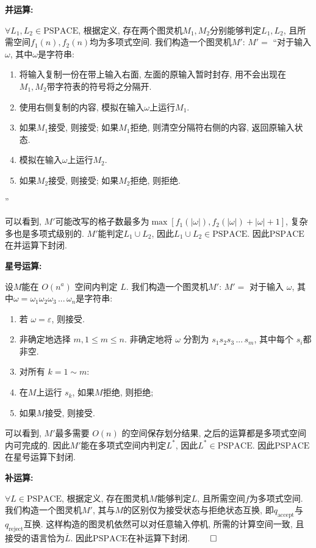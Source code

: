 \documentclass[UTF8]{report}
\renewenvironment{proof}{{\setlength{\parskip}{7pt}\noindent\hskip 2em \bf 证明 \quad}}{\hfill$\qed$\par}
\newcommand{\PSPACE}{\mathrm{PSPACE}}
\begin{document}
\begin{proof}
    \textbf{并运算:}

    $\forall L_1,L_2 \in \PSPACE$, 根据定义, 存在两个图灵机$M_1,M_2$分别能够判定$L_1,L_2$, 且所需空间$f_1(n), f_2(n)$均为多项式空间. 我们构造一个图灵机$M'$: $M' =$ ``对于输入$\omega$, 其中$\omega$是字符串:
    \begin{enumerate}
        \item 将输入复制一份在带上输入右面, 左面的原输入暂时封存, 用不会出现在$M_1, M_2$带字符表的符号将之分隔开.
        \item 使用右侧复制的内容, 模拟在输入$\omega$上运行$M_1$.
        \item 如果$M_1$接受, 则接受; 如果$M_1$拒绝, 则清空分隔符右侧的内容, 返回原输入状态.
        \item 模拟在输入$\omega$上运行$M_2$.
        \item 如果$M_2$接受, 则接受; 如果$M_2$拒绝, 则拒绝.
    \end{enumerate}
    ''

    可以看到, $M'$可能改写的格子数最多为$\max[f_1(|\omega|), f_2(|\omega|) + |\omega| + 1]$, 复杂多也是多项式级别的. $M'$能判定$L_1\cup L_2$, 因此$L_1\cup L_2 \in \PSPACE$. 因此$\PSPACE$在并运算下封闭.

    \textbf{星号运算:}

    设$M$能在 $O(n^a)$ 空间内判定 $L$. 我们构造一个图灵机$M'$: $M' =$ 对于输入 $\omega$, 其中$\omega = \omega_1 \omega_2 \omega_3\,...\,\omega_n$是字符串:
    \begin{enumerate}
        \item 若 $\omega = \varepsilon$, 则接受.
        \item 非确定地选择 $m, 1 \leq m \leq n$. 非确定地将 $\omega$ 分割为 $s_1s_2s_3\,...\,s_m$, 其中每个 $s_i$都非空.
        \item 对所有 $k=1 \sim m$:
        \item 在$M$上运行 $s_k$, 如果$M$拒绝, 则拒绝;
        \item 如果$M$接受, 则接受.
    \end{enumerate}
    

    可以看到, $M'$最多需要 $O(n)$ 的空间保存划分结果, 之后的运算都是多项式空间内可完成的. 因此$M'$能在多项式空间内判定$L^*$, 因此$L^* \in \PSPACE$. 因此$\PSPACE$在星号运算下封闭.

    \textbf{补运算:}

    $\forall L \in \PSPACE$, 根据定义, 存在图灵机$M$能够判定$L$, 且所需空间$f$为多项式空间. 我们构造一个图灵机$M'$, 其与$M$的区别仅为接受状态与拒绝状态互换, 即$q_{\mathrm{accept}}$与$q_{\mathrm{reject}}$互换. 这样构造的图灵机依然可以对任意输入停机, 所需的计算空间一致, 且接受的语言恰为$\overline{L}$. 因此$\PSPACE$在补运算下封闭.
\end{proof}
\end{document}
